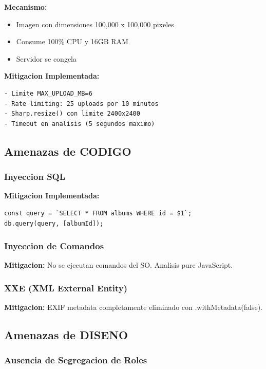 \documentclass[12pt,a4paper]{article}
\begin{document}
\textbf{Mecanismo:}
\begin{itemize}
    \item Imagen con dimensiones 100,000 x 100,000 pixeles
    \item Consume 100\% CPU y 16GB RAM
    \item Servidor se congela
\end{itemize}

\textbf{Mitigacion Implementada:}

\begin{lstlisting}
- Limite MAX_UPLOAD_MB=6
- Rate limiting: 25 uploads por 10 minutos
- Sharp.resize() con limite 2400x2400
- Timeout en analisis (5 segundos maximo)
\end{lstlisting}

\subsection{Amenazas de CODIGO}

\subsubsection{Inyeccion SQL}

\textbf{Mitigacion Implementada:}

\begin{lstlisting}
const query = `SELECT * FROM albums WHERE id = $1`;
db.query(query, [albumId]);
\end{lstlisting}

\subsubsection{Inyeccion de Comandos}

\textbf{Mitigacion:} No se ejecutan comandos del SO. Analisis pure JavaScript.

\subsubsection{XXE (XML External Entity)}

\textbf{Mitigacion:} EXIF metadata completamente eliminado con .withMetadata(false).

\subsection{Amenazas de DISENO}

\subsubsection{Ausencia de Segregacion de Roles}
\end{document}
